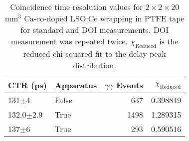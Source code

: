 \begin{table}
\caption{\label{tab:referencevals} Coincidence time resolution values for $2\times2\times20$mm$^3$ Ca-co-doped LSO:Ce wrapping in PTFE tape for standard and DOI measurements. DOI measurement was repeated twice. $\chi_\text{Reduced}$ is the reduced chi-squared fit to the delay peak distribution.}

\begin{tabular}{llrr}
\hline
       CTR (ps) &   Apparatus &  $\gamma\gamma$ Events &  $\chi_\text{Reduced}$ \\
\hline
     131$\pm$4 &  False &           637 &    0.398849 \\
 132.0$\pm$2.9 &   True &          1498 &    1.289315 \\
     137$\pm$6 &   True &           293 &    0.590516 \\
\hline
\end{tabular}
\end{table}